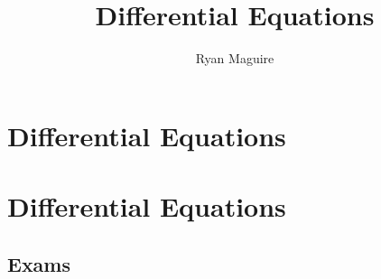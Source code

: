 \documentclass[crop=false,class=book,oneside]{standalone}
\begin{document}
    \newif\ifmathcoursesdifferentialequations
    \ifx\ifmathcourses\undefined
        \title{Differential Equations}
        \author{Ryan Maguire}
        \date{\vspace{-5ex}}
        \maketitle
        \tableofcontents
        \chapter*{Differential Equations}
        \setcounter{chapter}{1}
    \else
        \chapter{Differential Equations}
    \fi
    \section{Exams}
\end{document}
